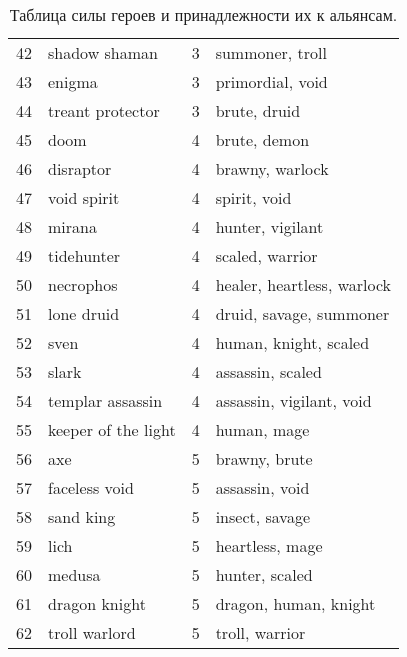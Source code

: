 \documentclass{article}
\begin{document}
\begin{table}
{\begin{tabular}{llrl}
42 &        shadow shaman &      3 &                summoner, troll \\
43 &               enigma &      3 &               primordial, void \\
44 &     treant protector &      3 &                   brute, druid \\
45 &                 doom &      4 &                   brute, demon \\
46 &            disraptor &      4 &               brawny, warlock  \\
47 &          void spirit &      4 &                   spirit, void \\
48 &               mirana &      4 &               hunter, vigilant \\
49 &           tidehunter &      4 &               scaled, warrior  \\
50 &            necrophos &      4 &    healer, heartless, warlock  \\
51 &           lone druid &      4 &        druid, savage, summoner \\
52 &                 sven &      4 &          human, knight, scaled \\
53 &                slark &      4 &               assassin, scaled \\
54 &     templar assassin &      4 &       assassin, vigilant, void \\
55 &  keeper of the light &      4 &                    human, mage \\
56 &                  axe &      5 &                  brawny, brute \\
57 &        faceless void &      5 &                 assassin, void \\
58 &            sand king &      5 &                 insect, savage \\
59 &                 lich &      5 &                heartless, mage \\
60 &               medusa &      5 &                 hunter, scaled \\
61 &        dragon knight &      5 &          dragon, human, knight \\
62 &        troll warlord &      5 &                troll, warrior  \\
\bottomrule
\end{tabular}
}
\caption{Таблица силы героев и принадлежности их к альянсам. }
\label{table:aliances}
\end{table}

\end{document}
